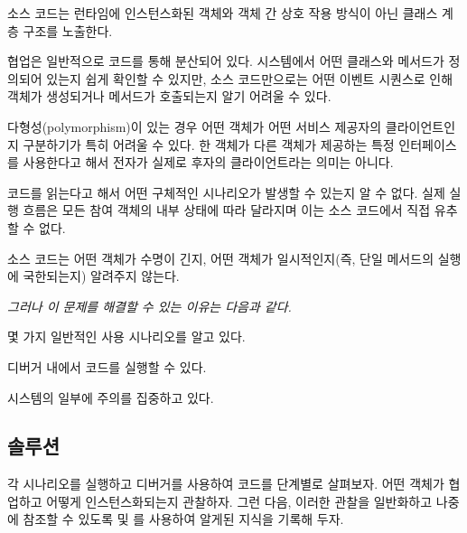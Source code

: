 \documentclass[a4paper,10pt,twoside]{book}
\begin{document}
\begin{bulletlist}
\item 소스 코드는 런타임에 인스턴스화된 객체와 객체 간 상호 작용 방식이 아닌 클래스 계층 구조를 노출한다.

\item 협업은 일반적으로 코드를 통해 분산되어 있다. 시스템에서 어떤 클래스와 메서드가 정의되어 있는지 쉽게 확인할 수 있지만, 소스 코드만으로는 어떤 이벤트 시퀀스로 인해 객체가 생성되거나 메서드가 호출되는지 알기 어려울 수 있다.

\item 다형성(polymorphism)이 있는 경우 어떤 객체가 어떤 서비스 제공자의 클라이언트인지 구분하기가 특히 어려울 수 있다. 한 객체가 다른 객체가 제공하는 특정 인터페이스를 사용한다고 해서 전자가 실제로 후자의 클라이언트라는 의미는 아니다.

\item 코드를 읽는다고 해서 어떤 구체적인 시나리오가 발생할 수 있는지 알 수 없다. 실제 실행 흐름은 모든 참여 객체의 내부 상태에 따라 달라지며 이는 소스 코드에서 직접 유추할 수 없다.

\item 소스 코드는 어떤 객체가 수명이 긴지, 어떤 객체가 일시적인지(즉, 단일 메서드의 실행에 국한되는지) 알려주지 않는다.
\end{bulletlist}

\emph{그러나 이 문제를 해결할 수 있는 이유는 다음과 같다.}

\begin{bulletlist}
\item 몇 가지 일반적인 사용 시나리오를 알고 있다.

\item 디버거 내에서 코드를 실행할 수 있다.

\item 시스템의 일부에 주의를 집중하고 있다.
\end{bulletlist}

\subsection*{솔루션}

각 시나리오를 실행하고 디버거를 사용하여 코드를 단계별로 살펴보자. 어떤 객체가 협업하고 어떻게 인스턴스화되는지 관찰하자. 그런 다음, 이러한 관찰을 일반화하고 나중에 참조할 수 있도록  및 를 사용하여 알게된 지식을 기록해 두자.
\end{document}
